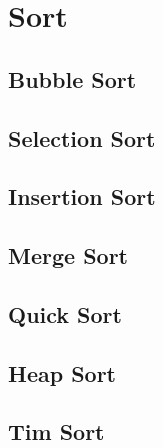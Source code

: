 \section{Sort}
\subsection{Bubble Sort}

\subsection{Selection Sort}\label{lbl-selectionsrt}

\subsection{Insertion Sort}\label{lbl-insertionsrt}

\subsection{Merge Sort}\label{lbl-mergesrt}

\subsection{Quick Sort}\label{lbl-quicksrt}

\subsection{Heap Sort}

\subsection{Tim Sort}

